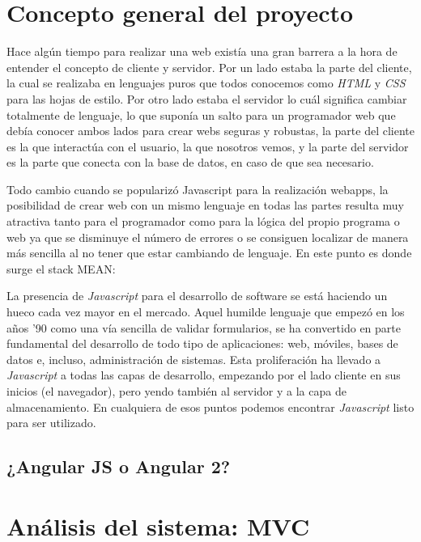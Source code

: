 \section{Concepto general del proyecto}\label{teorico-general}
Hace algún tiempo para realizar una web existía una gran barrera a la hora de entender el concepto de cliente y servidor. Por un lado estaba la parte del cliente, la cual se realizaba en lenguajes puros que todos conocemos como \emph{HTML} y \emph{CSS} para las hojas de estilo. Por otro lado estaba el servidor lo cuál significa cambiar totalmente de lenguaje, lo que suponía un salto para un programador web que debía conocer ambos lados para crear webs seguras y robustas, la parte del cliente es la que interactúa con el usuario, la que nosotros vemos, y la parte del servidor es la parte que conecta con la base de datos, en caso de que sea necesario.

Todo cambio cuando se popularizó Javascript para la realización webapps, la posibilidad de crear web con un mismo lenguaje en todas las partes resulta muy atractiva tanto para el programador como para la lógica del propio programa o web ya que se disminuye el número de errores o se consiguen localizar de manera más sencilla al no tener que estar cambiando de lenguaje. En este punto es donde surge el stack MEAN:


La presencia de \emph{Javascript} para el desarrollo de software se está haciendo un hueco cada vez mayor en el mercado. Aquel humilde lenguaje que empezó en los años '90 como una vía sencilla de validar formularios, se ha convertido en parte fundamental del desarrollo de todo tipo de aplicaciones: web, móviles, bases de datos e, incluso, administración de sistemas. Esta proliferación ha llevado a  \emph{Javascript} a todas las capas de desarrollo, empezando por el lado cliente en sus inicios (el navegador), pero yendo también al servidor y a la capa de almacenamiento. En cualquiera de esos puntos podemos encontrar  \emph{Javascript} listo para ser utilizado.


\subsection{¿Angular JS o Angular 2?}\label{angular-js-o-angular-2}



\section{Análisis del sistema: MVC}\label{analisis-sistema-mvc}


